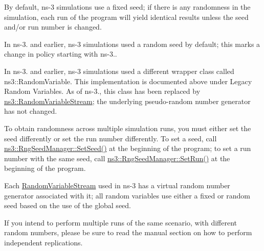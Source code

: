 \begin{DoxyItemize}
\item By default, ns-\/3 simulations use a fixed seed; if there is any randomness in the simulation, each run of the program will yield identical results unless the seed and/or run number is changed.
\item In ns-\/3. and earlier, ns-\/3 simulations used a random seed by default; this marks a change in policy starting with ns-\/3..
\item In ns-\/3. and earlier, ns-\/3 simulations used a different wrapper class called ns3\+::\+Random\+Variable. This implementation is documented above under Legacy Random Variables. As of ns-\/3., this class has been replaced by \hyperlink{classns3_1_1RandomVariableStream}{ns3\+::\+Random\+Variable\+Stream}; the underlying pseudo-\/random number generator has not changed.
\item To obtain randomness across multiple simulation runs, you must either set the seed differently or set the run number differently. To set a seed, call \hyperlink{classns3_1_1RngSeedManager_ab2a95901871c7b47a3dcf0f70adc58f4}{ns3\+::\+Rng\+Seed\+Manager\+::\+Set\+Seed()} at the beginning of the program; to set a run number with the same seed, call \hyperlink{classns3_1_1RngSeedManager_a14c9a839f8141b0e9ec2af0e96d68263}{ns3\+::\+Rng\+Seed\+Manager\+::\+Set\+Run()} at the beginning of the program.
\item Each \hyperlink{classns3_1_1RandomVariableStream}{Random\+Variable\+Stream} used in ns-\/3 has a virtual random number generator associated with it; all random variables use either a fixed or random seed based on the use of the global seed.
\item If you intend to perform multiple runs of the same scenario, with different random numbers, please be sure to read the manual section on how to perform independent replications. 
\end{DoxyItemize}